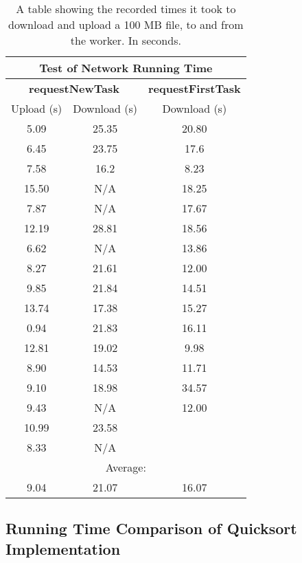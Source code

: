 \begin{table}[H]
\begin{center}
\begin{tabular}{|c|c|c|}
    \hline
    \multicolumn{3}{|c|}{Test of Network Running Time}\\
    \hline
    \multicolumn{2}{|c|}{\textbf{requestNewTask}} & \textbf{requestFirstTask} \\
    \hline
    Upload (s) & Download (s) & Download (s) \\
    \hline
    5.09 & 25.35 & 20.80 \\
    \hline
    6.45 & 23.75 & 17.6 \\
    \hline
    7.58 & 16.2 & 8.23 \\
    \hline
    15.50 & N/A & 18.25 \\
    \hline
    7.87 & N/A & 17.67 \\
    \hline
    12.19 & 28.81 & 18.56 \\
    \hline
    6.62 & N/A & 13.86 \\
    \hline
    8.27 & 21.61 & 12.00 \\
    \hline
    9.85 & 21.84 & 14.51 \\
    \hline
    13.74 & 17.38 & 15.27 \\
    \hline
    0.94 & 21.83 & 16.11 \\
    \hline
    12.81 & 19.02 & 9.98 \\
    \hline
    8.90 & 14.53 & 11.71 \\
    \hline
    9.10 & 18.98 & 34.57 \\
    \hline
    9.43 & N/A & 12.00 \\
    \hline
    10.99 & 23.58 &  \\
    \hline
    8.33 & N/A &  \\
    \hline
    \multicolumn{3}{|c|}{Average:}\\
    \hline
    9.04 & 21.07 & 16.07 \\
    \hline
\end{tabular}
\end{center}
\caption{A table showing the recorded times it took to download and upload a 100 MB file, to and from the worker. In seconds.}
\label{tab:networkOverhead}
\end{table} 

\subsection{Running Time Comparison of Quicksort Implementation}

